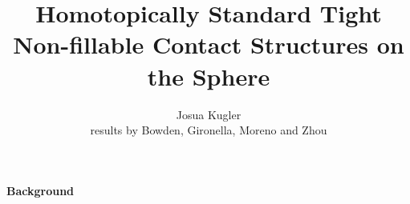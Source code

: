\documentclass{beamer}
\title[] %
{Homotopically Standard Tight Non-fillable Contact Structures on the Sphere}
\subtitle
{}
\author[Josua Kugler] %
{Josua Kugler \texorpdfstring{\\}{} results by Bowden, Gironella, Moreno and Zhou}
\institute%
{Heidelberg University}
\date[Sep 17th 2024] %
\newtheorem{conjecture}{Conjecture}
\begin{document}
\begin{frame}
  \titlepage
\end{frame}












    

\begin{frame}
\begin{tcolorbox}
\Huge \begin{center}
    \textbf{Background}
\end{center}
\end{tcolorbox}
\end{frame}
\end{document}
